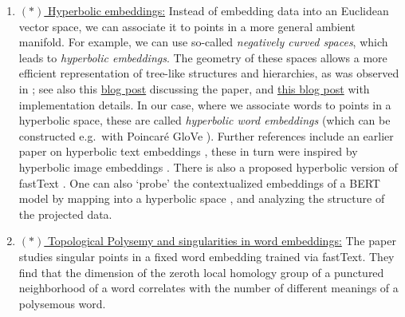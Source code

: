 \documentclass[11pt, a4paper]{amsart}
\begin{document}
\begin{enumerate}[resume]
    \item \underline{$(\ast)$ Hyperbolic embeddings:}
    \newline
    Instead of embedding data into an Euclidean vector space, we can associate it to points in a more general ambient manifold.
    For example, we can use so-called \emph{negatively curved spaces}, which leads to \emph{hyperbolic embeddings}.
    The geometry of these spaces allows a more efficient representation of tree-like structures and hierarchies, as was observed in \cite{DBLP:journals/corr/NickelK17}; see also this \href{https://bjlkeng.github.io/posts/hyperbolic-geometry-and-poincare-embeddings/}{blog post} discussing the paper, and \href{https://rare-technologies.com/implementing-poincare-embeddings/}{this blog post} with implementation details.
    In our case, where we associate words to points in a hyperbolic space, these are called \emph{hyperbolic word embeddings} (which can be constructed e.g.\ with Poincar{\'e} GloVe \cite{DBLP:journals/corr/abs-1810-06546}).
    Further references include an earlier paper on hyperbolic text embeddings \cite{DBLP:journals/corr/abs-1806-04313},
    these in turn were inspired by hyperbolic image embeddings \cite{DBLP:journals/corr/abs-1904-02239}.
    There is also a proposed hyperbolic version of fastText \cite{zhu-etal-2020-hypertext}.
    \newline
    One can also `probe' the contextualized embeddings of a BERT model by mapping into a hyperbolic space \cite{DBLP:journals/corr/abs-2104-03869}, and analyzing the structure of the projected data.
    
    \item \underline{$(\ast)$ Topological Polysemy and singularities in word embeddings:}
    \newline
    The paper \cite{jakubowski2020topology} studies singular points in a fixed word embedding trained via fastText.
    They find that the dimension of the zeroth local homology group of a punctured neighborhood of a word correlates with the number of different meanings of a polysemous word.
\end{enumerate}
\end{document}
